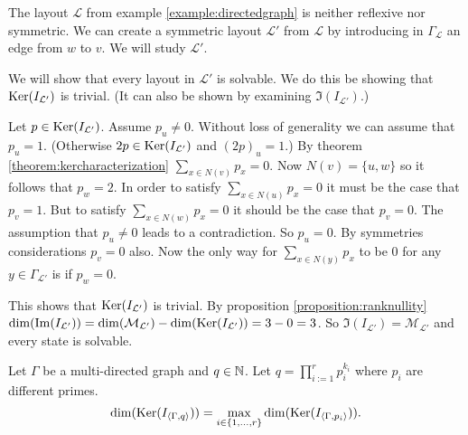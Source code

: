 \begin{example}
	The layout $\mathcal{L}$ from example \ref{example:directedgraph} is
	neither reflexive nor symmetric. We can create a symmetric layout
	$\mathcal{L}'$ from $\mathcal{L}$ by introducing in
	$\Gamma_{\mathcal{L}}$ an edge from $w$ to $v$. We will study
	$\mathcal{L}'$.
	
	We will show that every layout in $\mathcal{L}'$ is solvable. We do this
	be showing that $\operatorname{Ker}( I_{\mathcal{L}'} )$ is trivial. (It can
	also be shown by examining $\Im( I_{\mathcal{L}'} )$.)
	
	Let $p\in\operatorname{Ker}( I_{\mathcal{L}'} )$. Assume $p_{u} \not= 0$. Without loss
	of generality we can assume that $p_{u} = 1$. (Otherwise $2p\in \operatorname{Ker}(
	I_{\mathcal{L}'} )$ and $(2p)_{u} = 1$.) By theorem
	\ref{theorem:kercharacterization} $\sum_{x\in N(v)} p_{x} = 0$. Now
	$N(v) = \{u,w\}$ so it follows that $p_{w} = 2$. In order to satisfy
	$\sum_{x\in N(u)} p_{x} = 0$ it must be the case that $p_{v} = 1$. But
	to satisfy $\sum_{x\in N(w)} p_{x} = 0$ it should be the case that
	$p_{v} = 0$. The assumption that $p_{u} \not= 0$ leads to a
	contradiction. So $p_{u} = 0$. By symmetries considerations $p_{v} = 0$
	also. Now the only way for $\sum_{x\in N(y)} p_{x}$ to be $0$ for any
	$y\in\Gamma_{\mathcal{L}'}$ is if $p_{w} = 0$.
	
	This shows that $\operatorname{Ker}( I_{\mathcal{L}'} )$ is trivial. By proposition
	\ref{proposition:ranknullity} $\dim( \operatorname{Im}(I_{\mathcal{L}'}) ) =
	\dim(\mathcal{M}_{\mathcal{L}'}) - \dim( \operatorname{Ker}(I_{\mathcal{L}'}) ) = 3 -
	0 = 3$. So $\Im(I_{\mathcal{L}'}) = \mathcal{M}_{\mathcal{L}'}$ and
	every state is solvable.
\end{example}

\begin{conjecture}
	Let $\Gamma$ be a multi-directed graph and $q\in\mathbb{N}$. Let
	$q=\prod_{i:=1}^{r} p_{i}^{k_{i}}$ where $p_i$ are different primes.
	\[
		\dim(\operatorname{Ker}(I_{\langle\Gamma,q\rangle})) = \max_{i\in \{1,\ldots,r\}} \dim(\operatorname{Ker}(I_{\langle\Gamma,p_{i}\rangle})).
	\]
\end{conjecture}

